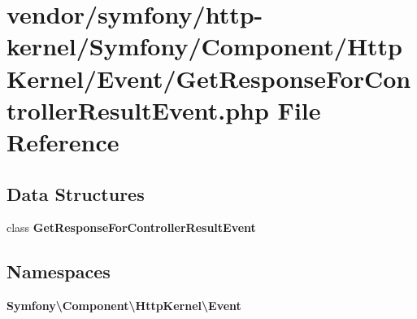\section{vendor/symfony/http-\/kernel/\+Symfony/\+Component/\+Http\+Kernel/\+Event/\+Get\+Response\+For\+Controller\+Result\+Event.php File Reference}
\label{_get_response_for_controller_result_event_8php}
\subsection*{Data Structures}
\begin{DoxyCompactItemize}
\item 
class {\bf Get\+Response\+For\+Controller\+Result\+Event}
\end{DoxyCompactItemize}
\subsection*{Namespaces}
\begin{DoxyCompactItemize}
\item 
 {\bf Symfony\textbackslash{}\+Component\textbackslash{}\+Http\+Kernel\textbackslash{}\+Event}
\end{DoxyCompactItemize}

